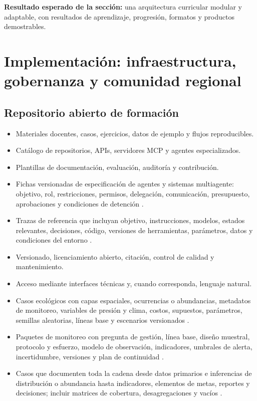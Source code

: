 \documentclass[11pt,a4paper]{article}
\begin{document}
\noindent\textbf{Resultado esperado de la sección:}
una arquitectura curricular modular y adaptable, con resultados de aprendizaje,
progresión, formatos y productos demostrables.

\section{Implementación: infraestructura, gobernanza y comunidad regional}

\subsection{Repositorio abierto de formación}

\begin{itemize}
  \item Materiales docentes, casos, ejercicios, datos de ejemplo y flujos
  reproducibles.
  \item Catálogo de repositorios, APIs, servidores MCP y agentes especializados.
  \item Plantillas de documentación, evaluación, auditoría y contribución.
  \item Fichas versionadas de especificación de agentes y sistemas multiagente:
  objetivo, rol, restricciones, permisos, delegación, comunicación, presupuesto,
  aprobaciones y condiciones de detención \citep{schneider2025generative}.
  \item Trazas de referencia que incluyan objetivo, instrucciones, modelos,
  estados relevantes, decisiones, código, versiones de herramientas, parámetros,
  datos y condiciones del entorno \citep{wei2025agentic}.
  \item Versionado, licenciamiento abierto, citación, control de calidad y
  mantenimiento.
  \item Acceso mediante interfaces técnicas y, cuando corresponda, lenguaje
  natural.
   \item Casos ecológicos con capas espaciales, ocurrencias o abundancias,
  metadatos de monitoreo, variables de presión y clima, costos, supuestos,
  parámetros, semillas aleatorias, líneas base y escenarios versionados
  \citep{silvestro2022improving,strannegard2026ecosystem}.
  \item Paquetes de monitoreo con pregunta de gestión, línea base, diseño muestral,
  protocolo y esfuerzo, modelo de observación, indicadores, umbrales de alerta,
  incertidumbre, versiones y plan de continuidad
  \citep{paton2009biodiversity,buckland2005monitoring}.
  \item Casos que documenten toda la cadena desde datos primarios e inferencias de
  distribución o abundancia hasta indicadores, elementos de metas, reportes y
  decisiones; incluir matrices de cobertura, desagregaciones y vacíos
  \citep{jetz2019ebv,affinito2025coverage}.
\end{itemize}
\end{document}
